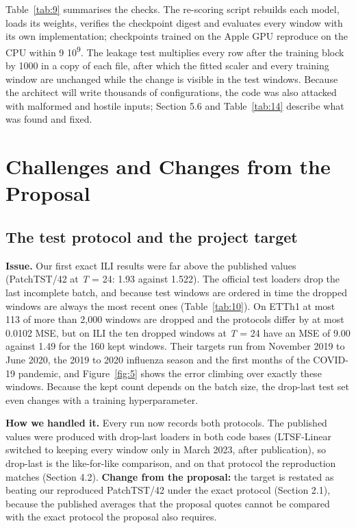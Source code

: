 \documentclass[11pt,letterpaper]{article}
\begin{document}
Table~\ref{tab:9} summarises the checks. The re-scoring script rebuilds each model, loads its weights, verifies the checkpoint digest and evaluates every window with its own implementation; checkpoints trained on the Apple GPU reproduce on the CPU within 9 \texttimes{} 10\textsuperscript{\textminus{}9}. The leakage test multiplies every row after the training block by 1000 in a copy of each file, after which the fitted scaler and every training window are unchanged while the change is visible in the test windows. Because the architect will write thousands of configurations, the code was also attacked with malformed and hostile inputs; Section 5.6 and Table~\ref{tab:14} describe what was found and fixed.

\section{Challenges and Changes from the Proposal}
\subsection{The test protocol and the project target}
\textbf{Issue.} Our first exact ILI results were far above the published values (PatchTST/42 at \textit{T} = 24: 1.93 against 1.522). The official test loaders drop the last incomplete batch, and because test windows are ordered in time the dropped windows are always the most recent ones (Table~\ref{tab:10}). On ETTh1 at most 113 of more than 2,000 windows are dropped and the protocols differ by at most 0.0102 MSE, but on ILI the ten dropped windows at \textit{T} = 24 have an MSE of 9.00 against 1.49 for the 160 kept windows. Their targets run from November 2019 to June 2020, the 2019 to 2020 influenza season and the first months of the COVID-19 pandemic, and Figure~\ref{fig:5} shows the error climbing over exactly these windows. Because the kept count depends on the batch size, the drop-last test set even changes with a training hyperparameter.

\textbf{How we handled it.} Every run now records both protocols. The published values were produced with drop-last loaders in both code bases (LTSF-Linear switched to keeping every window only in March 2023, after publication), so drop-last is the like-for-like comparison, and on that protocol the reproduction matches (Section 4.2). \textbf{Change from the proposal:} the target is restated as beating our reproduced PatchTST/42 under the exact protocol (Section 2.1), because the published averages that the proposal quotes cannot be compared with the exact protocol the proposal also requires.
\end{document}

